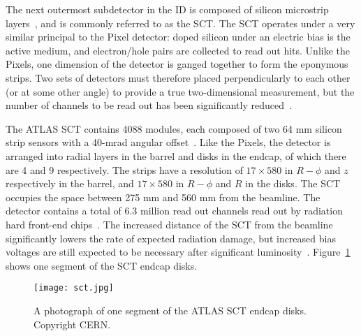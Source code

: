 The next outermost subdetector in the ID is composed of silicon microstrip layers~\cite{SCTPaper,ATLASPaper}, and is commonly referred to as the SCT.  The SCT operates under a very similar principal to the Pixel detector: doped silicon under an electric bias is the active medium, and electron/hole pairs are collected to read out hits. Unlike the Pixels, one dimension of the detector is ganged together to form the eponymous strips. Two sets of detectors must therefore placed perpendicularly to each other (or at some other angle) to provide a true two-dimensional measurement, but the number of channels to be read out has been significantly reduced~\cite{Detectors}.

The ATLAS SCT contains 4088 modules, each composed of two 64 mm silicon strip sensors with a 40-mrad angular offset~\cite{ATLASPaper}. Like the Pixels, the detector is arranged into radial layers in the barrel and disks in the endcap, of which there are 4 and 9 respectively. The strips have a resolution of $17 \times 580$ in $R-\phi$ and $z$ respectively in the barrel, and $17 \times 580$ in $R-\phi$ and $R$ in the disks. The SCT occupies the space between 275 mm and 560 mm from the beamline. The detector contains a total of 6.3 million read out channels read out by radiation hard front-end chips~\cite{SCTReadout}. The increased distance of the SCT from the beamline significantly lowers the rate of expected radiation damage, but increased bias voltages are still expected to be necessary after significant luminosity~\cite{SCTPaper,ATLASPaper}.  Figure~\ref{fig:detector:sct} shows one segment of the SCT endcap disks.



\begin{figure}
\centering
\texttt{[image: sct.jpg]}
\label{fig:detector:sct}
\caption{A photograph of one segment of the ATLAS SCT endcap disks. Copyright CERN.}
\end{figure}


